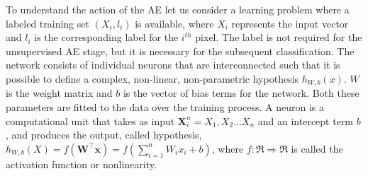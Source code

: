 To understand the action of the AE let us consider a learning problem where a labeled training set $(X_{i},l_{i})$ is available, where $X_i$ represents the input vector and $l_i$ is the corresponding label for the $i^{th}$ pixel. The label is not required for the unsupervised AE stage, but it is necessary for the subsequent classification. The  network consists of  individual neurons that are interconnected such that it is possible to define a complex, non-linear, non-parametric hypothesis $h_{W,b}(x)$.  $W$ is the weight matrix and $b$ is the vector of bias terms for the network. Both these parameters are fitted to the data over the training process. A neuron is a computational unit that takes as input $\bm{X}_i^{n} = X_1,X_2 ... X_n$ and an intercept term $b$, and produces the output, called hypothesis, $h_{W,b}(X) = f(\bm{W^{\intercal}x}) = f(\sum_{i=1}^{n}W_ix_i+b)$, where $f: \Re  \Rightarrow \Re $ is called the activation function or nonlinearity. 

